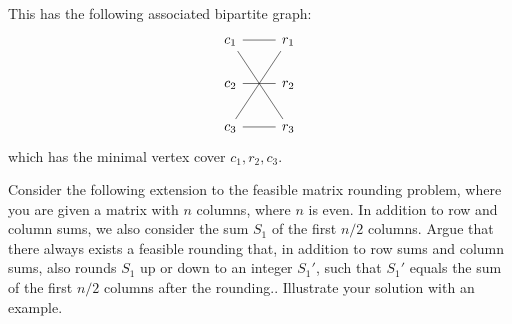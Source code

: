 \documentclass{article}
\begin{document}
\begin{solving}
\begin{example}
        This has the following associated bipartite graph:\begin{equation*}
            \begin{tikzcd}
            c_1\arrow[r, no head] \arrow[rdd, no head]&r_1\\
            c_2\arrow[r, no head]&r_2\\
            c_3\arrow[r, no head]\arrow[ruu, no head]&r_3
            \end{tikzcd}
        \end{equation*}
        which has the minimal vertex cover $c_1, r_2, c_3$. 
    \end{example}
\end{solving}
\newpage

\begin{exercise}
Consider the following extension to the feasible matrix rounding problem, where you are given a matrix with $n$ columns, where $n$ is even. In addition to row and column sums, we also consider the sum $S_1$ of the first $n/2$ columns. Argue that there always exists a feasible rounding that, in addition to row sums and column sums, also rounds $S_1$ up or down to an integer $S_1'$, such that $S_1'$ equals the sum of the first $n/2$ columns after the rounding.. Illustrate your solution with an example.    
\end{exercise}
\end{document}
